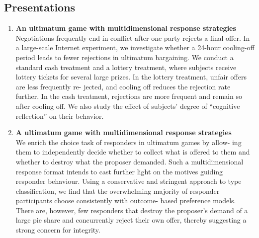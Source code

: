 \subsection{Presentations}
	\begin{enumerate}[label=\alph*\upshape)]
		\item \textbf{An ultimatum game with multidimensional response strategies} \\
			Negotiations frequently end in conflict after one party rejects a final offer. In a large-scale Internet experiment, we investigate whether a 24-hour cooling-off period leads to fewer rejections in ultimatum bargaining. We conduct a standard cash treatment and a lottery treatment, where subjects receive lottery tickets for several large prizes. In the lottery treatment, unfair offers are less frequently re- jected, and cooling off reduces the rejection rate further. In the cash treatment, rejections are more frequent and remain so after cooling off. We also study the effect of subjects’ degree of “cognitive reflection” on their behavior.
		\item \textbf{A ultimatum game with multidimensional response strategies}  \\
			We enrich the choice task of responders in ultimatum games by allow- ing them to independently decide whether to collect what is offered to them and whether to destroy what the proposer demanded. Such a multidimensional response format intends to cast further light on the motives guiding responder behaviour. Using a conservative and stringent approach to type classification, we find that the overwhelming majority of responder participants choose consistently with outcome- based preference models. There are, however, few responders that destroy the proposer’s demand of a large pie share and concurrently reject their own offer, thereby suggesting a strong concern for integrity.
	\end{enumerate}
\newpage